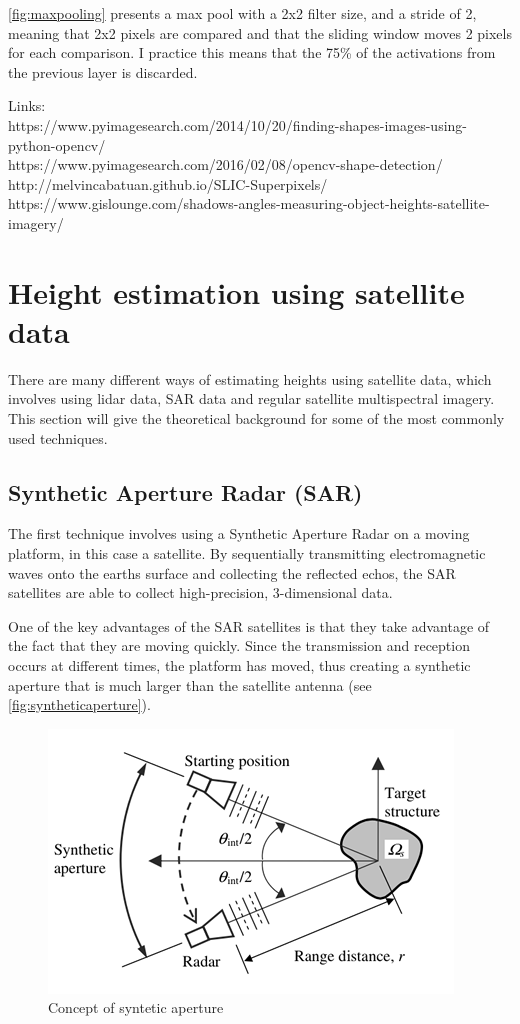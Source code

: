 \autoref{fig:maxpooling} presents a max pool with a 2x2 filter size, and a stride of 2, meaning that 2x2 pixels are compared and that the sliding window moves 2 pixels for each comparison. I practice this means that the 75\% of the activations from the previous layer is discarded.

Links:\\
https://www.pyimagesearch.com/2014/10/20/finding-shapes-images-using-python-opencv/\\
https://www.pyimagesearch.com/2016/02/08/opencv-shape-detection/
\\
http://melvincabatuan.github.io/SLIC-Superpixels/
\\
https://www.gislounge.com/shadows-angles-measuring-object-heights-satellite-imagery/
\\

\section{Height estimation using satellite data}\label{section:theoreticheight}

There are many different ways of estimating heights using satellite data, which involves using lidar data, SAR data and regular satellite multispectral imagery. This section will give the theoretical background for some of the most commonly used techniques.

\subsection{Synthetic Aperture Radar (SAR)}
The first technique involves using a Synthetic Aperture Radar on a moving platform, in this case a satellite. By sequentially transmitting electromagnetic waves onto the earths surface and collecting the reflected echos, the SAR satellites are able to collect high-precision, 3-dimensional data.

One of the key advantages of the SAR satellites is that they take advantage of the fact that they are moving quickly. Since the transmission and reception occurs at different times, the platform has moved, thus creating a synthetic aperture that is much larger than the satellite antenna (see \autoref{fig:syntheticaperture}).

\begin{figure}[!h]
	\centering
	\includegraphics[scale=0.7]{fig/sar.jpg}
	\caption{Concept of syntetic aperture \cite{Yu2012}}
	\label{fig:syntheticaperture}
\end{figure}

